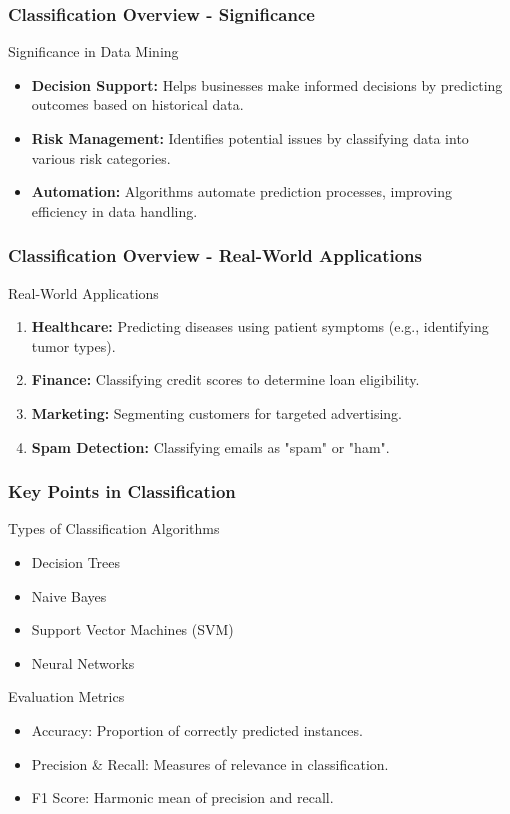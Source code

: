 \documentclass[aspectratio=169]{beamer}
\begin{document}
\begin{frame}[fragile]
    \frametitle{Classification Overview - Significance}
    \begin{block}{Significance in Data Mining}
        \begin{itemize}
            \item \textbf{Decision Support:} Helps businesses make informed decisions by predicting outcomes based on historical data.
            \item \textbf{Risk Management:} Identifies potential issues by classifying data into various risk categories.
            \item \textbf{Automation:} Algorithms automate prediction processes, improving efficiency in data handling.
        \end{itemize}
    \end{block}
\end{frame}

\begin{frame}[fragile]
    \frametitle{Classification Overview - Real-World Applications}
    \begin{block}{Real-World Applications}
        \begin{enumerate}
            \item \textbf{Healthcare:} Predicting diseases using patient symptoms (e.g., identifying tumor types).
            \item \textbf{Finance:} Classifying credit scores to determine loan eligibility.
            \item \textbf{Marketing:} Segmenting customers for targeted advertising.
            \item \textbf{Spam Detection:} Classifying emails as "spam" or "ham".
        \end{enumerate}
    \end{block}
\end{frame}

\begin{frame}[fragile]
    \frametitle{Key Points in Classification}
    \begin{block}{Types of Classification Algorithms}
        \begin{itemize}
            \item Decision Trees
            \item Naive Bayes
            \item Support Vector Machines (SVM)
            \item Neural Networks
        \end{itemize}
    \end{block}
    \begin{block}{Evaluation Metrics}
        \begin{itemize}
            \item Accuracy: Proportion of correctly predicted instances.
            \item Precision \& Recall: Measures of relevance in classification.
            \item F1 Score: Harmonic mean of precision and recall.
        \end{itemize}
    \end{block}
\end{frame}
\end{document}
